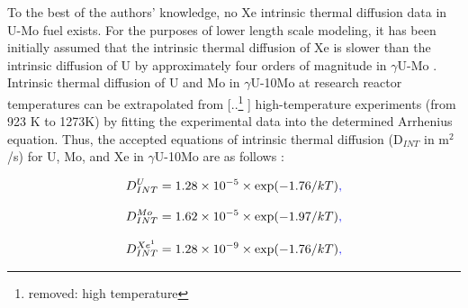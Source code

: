 \documentclass[preprint,12pt]{elsarticle}
\providecommand{\DIFadd}[1]{{\protect\color{blue} \sf #1}} %
\providecommand{\DIFdel}[1]{{\protect\color{red} [..\footnote{removed: #1} ]}} %
\providecommand{\DIFaddbegin}{} %
\providecommand{\DIFaddend}{} %
\providecommand{\DIFdelbegin}{} %
\providecommand{\DIFdelend}{} %
\newcommand{\DIFscaledelfig}{0.5}
\newlength{\DIFdelgraphicswidth} %
\newlength{\DIFdelgraphicsheight} %
\newcommand{\DIFaddincludegraphics}[2][]{{\color{blue}\fbox{\DIFOincludegraphics[#1]{#2}}}} %
\newcommand{\DIFdelincludegraphics}[2][]{%
\sbox{\DIFdelgraphicsbox}{\DIFOincludegraphics[#1]{#2}}%
\settoboxwidth{\DIFdelgraphicswidth}{\DIFdelgraphicsbox} %
\settoboxtotalheight{\DIFdelgraphicsheight}{\DIFdelgraphicsbox} %
\scalebox{\DIFscaledelfig}{%
\parbox[b]{\DIFdelgraphicswidth}{\usebox{\DIFdelgraphicsbox}\\[-\baselineskip] \rule{\DIFdelgraphicswidth}{0em}}\llap{\resizebox{\DIFdelgraphicswidth}{\DIFdelgraphicsheight}{%
\setlength{\unitlength}{\DIFdelgraphicswidth}%
\begin{picture}(1,1)%
\thicklines\linethickness{2pt} %
{\color[rgb]{1,0,0}\put(0,0){\framebox(1,1){}}}%
{\color[rgb]{1,0,0}\put(0,0){\line( 1,1){1}}}%
{\color[rgb]{1,0,0}\put(0,1){\line(1,-1){1}}}%
\end{picture}%
}\hspace*{3pt}}} %
} %
\DeclareRobustCommand{\DIFaddbegin}{\DIFOaddbegin \let\includegraphics\DIFaddincludegraphics} %
\DeclareRobustCommand{\DIFaddend}{\DIFOaddend \let\includegraphics\DIFOincludegraphics} %
\DeclareRobustCommand{\DIFdelbegin}{\DIFOdelbegin \let\includegraphics\DIFdelincludegraphics} %
\DeclareRobustCommand{\DIFdelend}{\DIFOaddend \let\includegraphics\DIFOincludegraphics} %
\begin{document}
\DIFdelend To the best of the authors' knowledge, no Xe intrinsic thermal diffusion data in U-Mo fuel exists. For the purposes of lower length scale modeling, it has been initially assumed that \DIFaddbegin \DIFadd{the }\DIFaddend intrinsic thermal diffusion of Xe is slower than the intrinsic diffusion of U by approximately four orders of magnitude in $\gamma$U-Mo \cite{hu2016formation, hu2016microstructural, Beeler2018microstructural}. Intrinsic thermal diffusion of U and Mo in $\gamma$U-10Mo at research reactor temperatures can be extrapolated from \DIFdelbegin \DIFdel{high temperature }\DIFdelend \DIFaddbegin \DIFadd{high-temperature }\DIFaddend experiments (from 923 K to 1273K) by fitting the experimental data \cite{huang2013} into the determined Arrhenius equation. Thus, the accepted equations of intrinsic thermal diffusion (D$_{INT}$ \DIFaddbegin \DIFadd{in m$^{2}$/s}\DIFaddend ) for U, Mo, and Xe in $\gamma$U-10Mo are as follows \cite{hu2016formation, hu2016microstructural, Beeler2018microstructural, huang2013}:

\begin{equation}
D_{INT}^{U} = 1.28\times10^{-5}\times \textrm{exp}(-1.76/kT)\DIFaddbegin \DIFadd{,
}\DIFaddend \end{equation}

\begin{equation}
D_{INT}^{Mo} = 1.62\times10^{-5}\times \textrm{exp}(-1.97/kT)\DIFaddbegin \DIFadd{,
}\DIFaddend \end{equation}

\begin{equation}
D_{INT}^{Xe^{1}} = 1.28\times10^{-9}\times \textrm{exp}(-1.76/kT)\DIFaddbegin \DIFadd{,
}\DIFaddend \end{equation}
\end{document}
